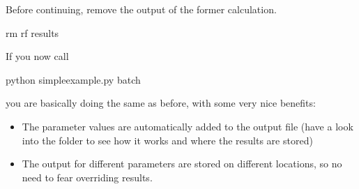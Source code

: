 \documentclass[letterpaper,10pt,english]{sphinxmanual}
\begin{document}
\begin{enumerate}
\begin{sphinxVerbatim}[commandchars=\\\{\},numbers=left,firstnumber=1,stepnumber=1]
            


   
     
    \PYG{p}{[}    \PYG{p}{]}
\end{sphinxVerbatim}

Before continuing, remove the output of the former calculation.

\begin{sphinxVerbatim}[commandchars=\\\{\}]
rm \PYGZhy{}rf results
\end{sphinxVerbatim}

If you now call

\begin{sphinxVerbatim}[commandchars=\\\{\}]
python simple\PYGZhy{}example.py \PYGZhy{}\PYGZhy{}batch
\end{sphinxVerbatim}

you are basically doing the same as before, with some very nice benefits:
\begin{itemize}
\item {} 
The parameter values are automatically added to the output file (have a look into the 
folder to see how it works and where the results are stored)

\item {} 
The output for different parameters are stored on different locations, so no need to fear overriding
results.


\end{itemize}
\end{enumerate}
\end{document}
